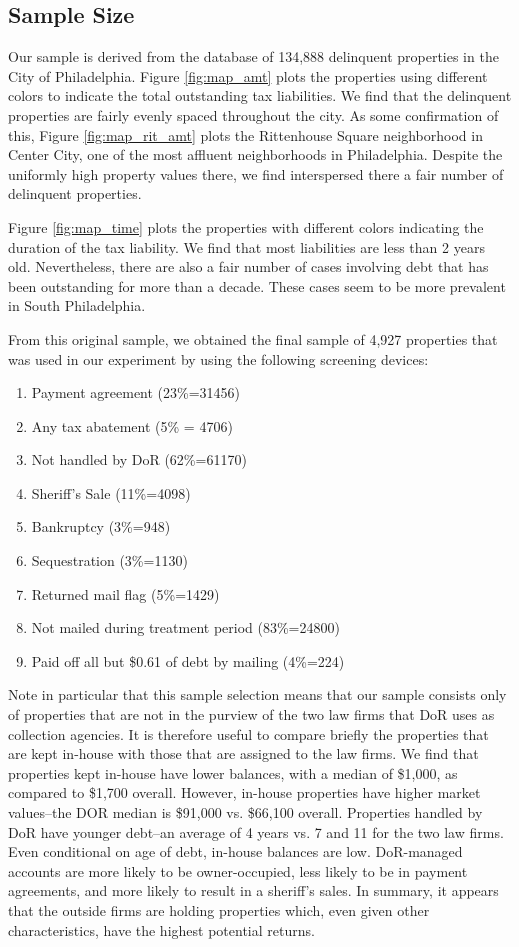 \documentclass[12pt,titlepage]{article}
\begin{document}
\subsection{Sample Size}

Our sample is derived from the database of 134,888 delinquent properties in the
City of Philadelphia. Figure \ref{fig:map_amt} plots the properties
using different colors to indicate the total outstanding tax
liabilities.  We find that the delinquent properties are fairly evenly
spaced throughout the city. As some confirmation of this, Figure \ref{fig:map_rit_amt}
plots the Rittenhouse Square neighborhood in Center City, one
of the most affluent neighborhoods in Philadelphia. Despite the 
uniformly high property values there, we find interspersed there a
fair number of delinquent properties.

Figure \ref{fig:map_time} plots the properties with different colors
indicating the duration of the tax liability. We find that
most liabilities are less than 2 years old. Nevertheless, there are also a
fair number of cases involving debt that has been outstanding for
more than a decade. These cases seem to be more prevalent in South Philadelphia.

From this original sample, we obtained the final sample 
of 4,927 properties that was used in our experiment by using
the following screening devices:
\begin{enumerate}
\item Payment agreement (23\%=31456)
\item Any tax abatement (5\% = 4706)
\item Not handled by DoR (62\%=61170)
\item Sheriff's Sale (11\%=4098)
\item Bankruptcy (3\%=948)
\item Sequestration (3\%=1130)
\item Returned mail flag (5\%=1429)
\item Not mailed during treatment period (83\%=24800)
\item Paid off all but \$0.61 of debt by mailing (4\%=224)
\end{enumerate}

Note in particular that this sample selection means
that our sample consists only of properties that are not
in the purview of the two law firms that DoR uses as collection
agencies. It is therefore useful to compare briefly the properties that are kept
in-house with those that are assigned to the law firms. We find that
properties kept in-house have lower balances, with a median of
\$1,000, as compared to \$1,700 overall. However, in-house properties have higher
market values--the DOR median is \$91,000 vs. \$66,100 overall. Properties
handled by DoR have younger debt--an average of 4 years vs. 7 and 11 for the
two law firms.  Even conditional on age of debt, in-house balances are
low.  DoR-managed accounts are more likely to be owner-occupied, less
likely to be in payment agreements, and more likely to result in a
sheriff's sales. In summary, it appears that the outside firms are
holding properties which, even given other characteristics, have
the highest potential returns.
\end{document}
